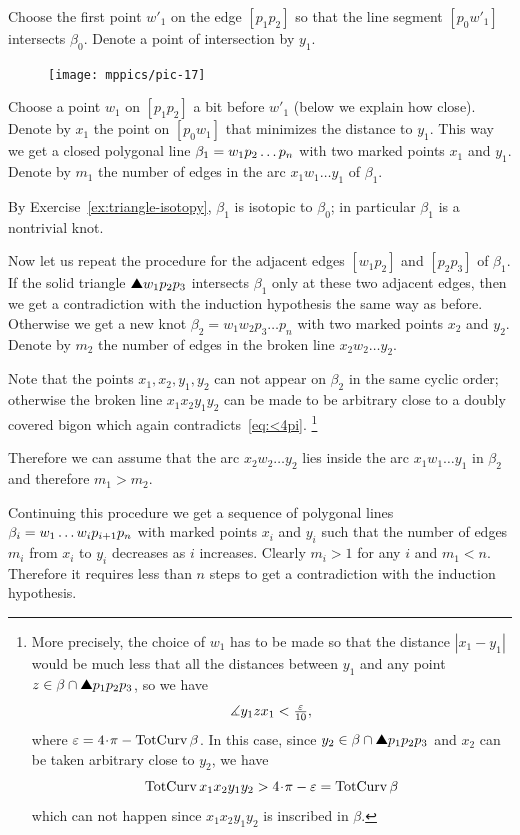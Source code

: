 Choose the first point $w'_1$ on the edge $[p_1p_2]$ so that the line segment $[p_0w'_1]$ 
intersects $\beta_0$.
Denote a point of intersection by $y_1$.

\begin{figure}
\vskip-0mm
\centering
\texttt{[image: mppics/pic-17]}
\vskip0mm
\end{figure}

Choose a point $w_1$ on $[p_1p_2]$ a bit before $w'_1$
(below we explain how close).
Denote by $x_1$ the point on $[p_0w_1]$ that minimizes the distance to $y_1$.
This way we get a closed polygonal line 
$\beta_1\z=w_1p_2\dots p_n$ with two marked points $x_1$ and $y_1$.
Denote by $m_1$ the number of edges in the arc $x_1w_1\dots y_1$ of $\beta_1$.

By Exercise~\ref{ex:triangle-isotopy}, $\beta_1$ is isotopic to $\beta_0$;
in particular $\beta_1$ is a nontrivial knot.

Now let us repeat the procedure for the adjacent edges $[w_1p_2]$ and $[p_2p_3]$ of $\beta_1$.
If the solid triangle $\solidtriangle w_1p_2p_3$ intersects $\beta_1$ only at these two adjacent edges, then we get a contradiction with the induction hypothesis the same way as before.
Otherwise we get a new knot $\beta_2=w_1w_2p_3\dots p_n$ with two marked points $x_2$ and $y_2$.
Denote by $m_2$ the number of edges in the broken line $x_2w_2\dots y_2$.

Note that the points $x_1,x_2,y_1,y_2$ can not appear on $\beta_2$ in the same cyclic order;
otherwise the broken line $x_1x_2y_1y_2$ can be made to be arbitrary close to a doubly covered bigon which again contradicts~\ref{eq:<4pi}.%
\footnote{More precisely, the choice of $w_1$ has to be made so that the distance $|x_1-y_1|$ would be much less that all the distances between $y_1$ and any point $z\in\beta\cap \solidtriangle p_1p_2p_3$, so we have
\[\measuredangle y_1zx_1<\tfrac{\varepsilon}{10},\]
where $\eps=4\cdot\pi-\tc\beta$.
In this case, since $y_2\in \beta\cap \solidtriangle p_1p_2p_3$ and $x_2$ can be taken arbitrary close to $y_2$, we have
\[\tc x_1x_2y_1y_2 > 4\cdot\pi -\eps= \tc\beta\]
which can not happen since $x_1x_2y_1y_2$ is inscribed in $\beta$.}

Therefore we can assume that the arc $x_2w_2\dots y_2$ lies inside the arc $x_1w_1\dots y_1$ in $\beta_2$
and therefore $m_1>m_2$.

Continuing this procedure we get a sequence of polygonal lines $\beta_i\z=w_1\dots w_i p_{i+1}p_n$ with marked points $x_i$ and $y_i$ such that the number of edges $m_i$ from $x_i$ to $y_i$ decreases as $i$ increases.
Clearly $m_i>1$ for any $i$ and $m_1<n$.
Therefore it requires less than $n$ steps to get a contradiction with the induction hypothesis.
\qeds

